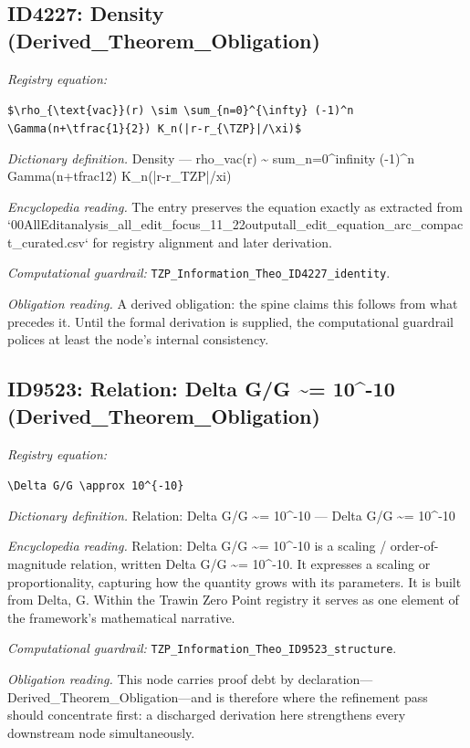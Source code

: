 \documentclass[11pt]{article}
\theoremstyle{remark}
\begin{document}
\subsection{ID4227: Density (Derived\_Theorem\_Obligation)}

\noindent\textit{Registry equation:}\par
{\small\texttt{\$\textbackslash{}rho\_\{\textbackslash{}text\{vac\}\}(r) \textbackslash{}sim \textbackslash{}sum\_\{n=0\}\textasciicircum{}\{\textbackslash{}infty\} (-1)\textasciicircum{}n \textbackslash{}Gamma(n+\textbackslash{}tfrac\{1\}\{2\}) K\_n(|r-r\_\{\textbackslash{}TZP\}|/\textbackslash{}xi)\$}}\par\medskip
\noindent\textit{Dictionary definition.} Density --- rho\_vac(r) \textasciitilde{} sum\_n=0\textasciicircum{}infinity (-1)\textasciicircum{}n Gamma(n+tfrac12) K\_n(|r-r\_TZP|/xi)\par\medskip
\noindent\textit{Encyclopedia reading.} The entry preserves the equation exactly as extracted from `00AllEditanalysis\_all\_edit\_focus\_11\_22outputall\_edit\_equation\_arc\_compact\_curated.csv` for registry alignment and later derivation.
\par\medskip\noindent\textit{Computational guardrail:} \texttt{TZP\_Information\_Theo\_ID4227\_identity}.
\par\medskip\noindent\textit{Obligation reading.} A derived obligation: the spine claims this follows from what precedes it. Until the formal derivation is supplied, the computational guardrail polices at least the node's internal consistency.

\subsection{ID9523: Relation: Delta G/G \textasciitilde{}= 10\textasciicircum{}-10 (Derived\_Theorem\_Obligation)}

\noindent\textit{Registry equation:}\par
{\small\texttt{\textbackslash{}Delta G/G \textbackslash{}approx 10\textasciicircum{}\{-10\}}}\par\medskip
\noindent\textit{Dictionary definition.} Relation: Delta G/G \textasciitilde{}= 10\textasciicircum{}-10 --- Delta G/G \textasciitilde{}= 10\textasciicircum{}-10\par\medskip
\noindent\textit{Encyclopedia reading.} Relation: Delta G/G \textasciitilde{}= 10\textasciicircum{}-10 is a scaling / order-of-magnitude relation, written Delta G/G \textasciitilde{}= 10\textasciicircum{}-10. It expresses a scaling or proportionality, capturing how the quantity grows with its parameters. It is built from Delta, G. Within the Trawin Zero Point registry it serves as one element of the framework's mathematical narrative.
\par\medskip\noindent\textit{Computational guardrail:} \texttt{TZP\_Information\_Theo\_ID9523\_structure}.
\par\medskip\noindent\textit{Obligation reading.} This node carries proof debt by declaration---Derived\_Theorem\_Obligation---and is therefore where the refinement pass should concentrate first: a discharged derivation here strengthens every downstream node simultaneously.
\end{document}
